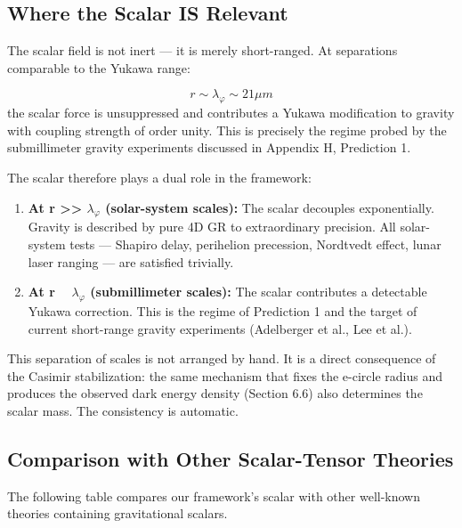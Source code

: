 \documentclass[aps,prd,preprint,superscriptaddress,longbibliography,floatfix]{revtex4-2}
\theoremstyle{remark}
\begin{document}
\subsection{Where the Scalar IS Relevant}

The scalar field is not inert --- it is merely short-ranged. At separations comparable to the Yukawa range:


\begin{equation}
    r \sim  \lambda_\varphi \sim  21 \mu m
\end{equation}
the scalar force is unsuppressed and contributes a Yukawa modification to gravity with coupling strength of order unity. This is precisely the regime probed by the submillimeter gravity experiments discussed in Appendix H, Prediction 1.

The scalar therefore plays a dual role in the framework:


\begin{enumerate}
  \item \textbf{At r >> $\lambda_\varphi$ (solar-system scales):} The scalar decouples exponentially. Gravity is described by pure 4D GR to extraordinary precision. All solar-system tests --- Shapiro delay, perihelion precession, Nordtvedt effect, lunar laser ranging --- are satisfied trivially.
  \item \textbf{At r ~ $\lambda_\varphi$ (submillimeter scales):} The scalar contributes a detectable Yukawa correction. This is the regime of Prediction 1 and the target of current short-range gravity experiments (Adelberger et al., Lee et al.).
\end{enumerate}

This separation of scales is not arranged by hand. It is a direct consequence of the Casimir stabilization: the same mechanism that fixes the e-circle radius and produces the observed dark energy density (Section 6.6) also determines the scalar mass. The consistency is automatic.



\subsection{Comparison with Other Scalar-Tensor Theories}

The following table compares our framework's scalar with other well-known theories containing gravitational scalars.
\end{document}

